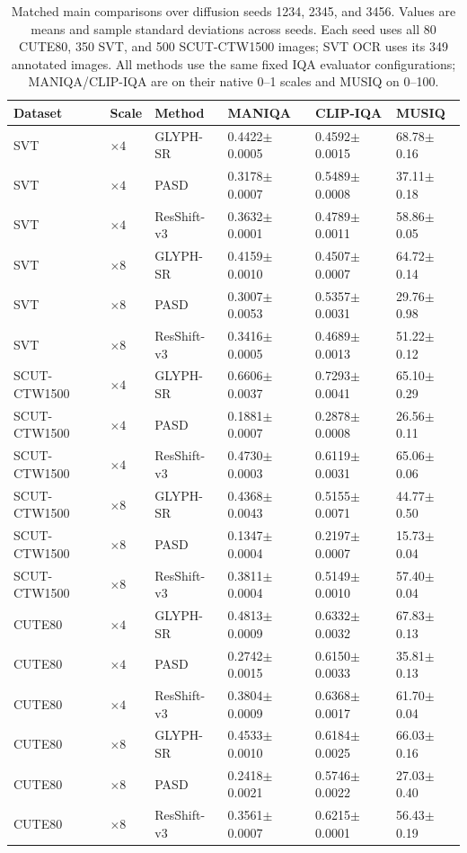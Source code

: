 \begin{table}[H]
\centering
\caption{Matched main comparisons over diffusion seeds 1234, 2345, and 3456. Values are means and sample standard deviations across seeds. Each seed uses all 80 CUTE80, 350 SVT, and 500 SCUT-CTW1500 images; SVT OCR uses its 349 annotated images. All methods use the same fixed IQA evaluator configurations; MANIQA/CLIP-IQA are on their native 0--1 scales and MUSIQ on 0--100.}
\label{tab:ar-main-iqa}
\small
\setlength{\tabcolsep}{4pt}
\begin{tabular}{llllll}
\toprule
Dataset & Scale & Method & MANIQA & CLIP-IQA & MUSIQ \\
\midrule
SVT & $\times4$ & GLYPH-SR & 0.4422$\pm$0.0005 & 0.4592$\pm$0.0015 & 68.78$\pm$0.16 \\
SVT & $\times4$ & PASD & 0.3178$\pm$0.0007 & 0.5489$\pm$0.0008 & 37.11$\pm$0.18 \\
SVT & $\times4$ & ResShift-v3 & 0.3632$\pm$0.0001 & 0.4789$\pm$0.0011 & 58.86$\pm$0.05 \\
SVT & $\times8$ & GLYPH-SR & 0.4159$\pm$0.0010 & 0.4507$\pm$0.0007 & 64.72$\pm$0.14 \\
SVT & $\times8$ & PASD & 0.3007$\pm$0.0053 & 0.5357$\pm$0.0031 & 29.76$\pm$0.98 \\
SVT & $\times8$ & ResShift-v3 & 0.3416$\pm$0.0005 & 0.4689$\pm$0.0013 & 51.22$\pm$0.12 \\
SCUT-CTW1500 & $\times4$ & GLYPH-SR & 0.6606$\pm$0.0037 & 0.7293$\pm$0.0041 & 65.10$\pm$0.29 \\
SCUT-CTW1500 & $\times4$ & PASD & 0.1881$\pm$0.0007 & 0.2878$\pm$0.0008 & 26.56$\pm$0.11 \\
SCUT-CTW1500 & $\times4$ & ResShift-v3 & 0.4730$\pm$0.0003 & 0.6119$\pm$0.0031 & 65.06$\pm$0.06 \\
SCUT-CTW1500 & $\times8$ & GLYPH-SR & 0.4368$\pm$0.0043 & 0.5155$\pm$0.0071 & 44.77$\pm$0.50 \\
SCUT-CTW1500 & $\times8$ & PASD & 0.1347$\pm$0.0004 & 0.2197$\pm$0.0007 & 15.73$\pm$0.04 \\
SCUT-CTW1500 & $\times8$ & ResShift-v3 & 0.3811$\pm$0.0004 & 0.5149$\pm$0.0010 & 57.40$\pm$0.04 \\
CUTE80 & $\times4$ & GLYPH-SR & 0.4813$\pm$0.0009 & 0.6332$\pm$0.0032 & 67.83$\pm$0.13 \\
CUTE80 & $\times4$ & PASD & 0.2742$\pm$0.0015 & 0.6150$\pm$0.0033 & 35.81$\pm$0.13 \\
CUTE80 & $\times4$ & ResShift-v3 & 0.3804$\pm$0.0009 & 0.6368$\pm$0.0017 & 61.70$\pm$0.04 \\
CUTE80 & $\times8$ & GLYPH-SR & 0.4533$\pm$0.0010 & 0.6184$\pm$0.0025 & 66.03$\pm$0.16 \\
CUTE80 & $\times8$ & PASD & 0.2418$\pm$0.0021 & 0.5746$\pm$0.0022 & 27.03$\pm$0.40 \\
CUTE80 & $\times8$ & ResShift-v3 & 0.3561$\pm$0.0007 & 0.6215$\pm$0.0001 & 56.43$\pm$0.19 \\
\bottomrule
\end{tabular}
\end{table}
